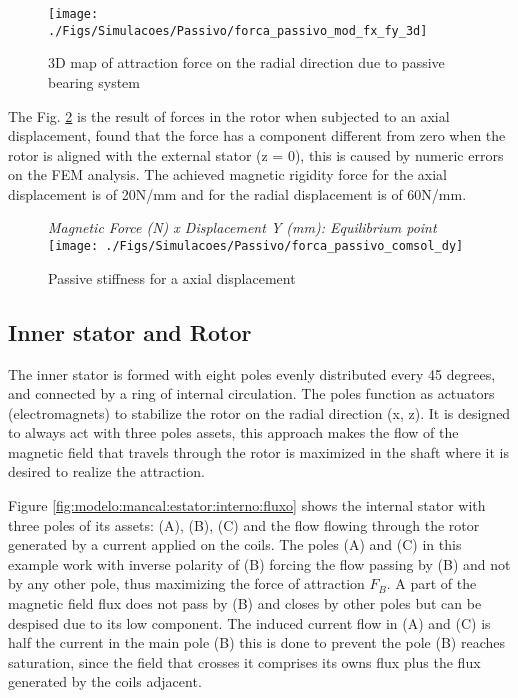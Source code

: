 \documentclass[10pt,fleqn,a4paper,twoside]{article}
\begin{document}
	\begin{figure}[th]
		\centering
		\texttt{[image: ./Figs/Simulacoes/Passivo/forca\_passivo\_mod\_fx\_fy\_3d]}
		\caption{3D map of attraction force on the radial direction due to passive bearing system}
		\label{fig:forca:passivo:mod:fx:fy:3d}
	\end{figure}
	
	The Fig. \ref{fig:forca:passivo:comsol:dy} is the result of forces in the rotor when subjected to an axial displacement,  found that the force has a component different from zero when the rotor is aligned with the external stator (z = 0), this is caused by numeric errors on the FEM analysis. The achieved magnetic rigidity force for the axial displacement is of 20N/mm and for the radial displacement is of 60N/mm. 
	
	\begin{figure}[ht]
		\centering
		{\textit{Magnetic Force (N) x Displacement Y (mm): Equilibrium point}}\\
		\texttt{[image: ./Figs/Simulacoes/Passivo/forca\_passivo\_comsol\_dy]}
		\caption{Passive stiffness for a axial displacement }
		\label{fig:forca:passivo:comsol:dy}
	\end{figure}
	
	\subsection{Inner stator and Rotor}
	
	The inner stator is formed with eight poles evenly distributed every 45 degrees, and connected by a ring of internal circulation. The poles function as actuators (electromagnets) to stabilize the rotor on the radial direction (x, z).  It is designed to always act with three poles assets, this approach makes the flow of the magnetic field that travels through the rotor is maximized in the shaft where it is desired to realize the attraction.
	
	Figure \ref{fig:modelo:mancal:estator:interno:fluxo} shows the internal stator with three poles of its assets: (A), (B), (C) and the flow flowing through the rotor generated by a current applied on the coils. The poles (A) and (C) in this example work with inverse polarity of (B) forcing the flow passing by (B) and not by any other pole, thus maximizing the force of attraction $F_B$. A part of the magnetic field flux does not pass by (B) and closes by other poles but can be despised due to its low component. The induced current flow in (A) and (C) is half the current in the main pole (B) this is done to prevent the pole (B) reaches saturation, since the field that crosses it comprises its owns flux plus the flux generated by the coils adjacent. 
	
\end{document}
